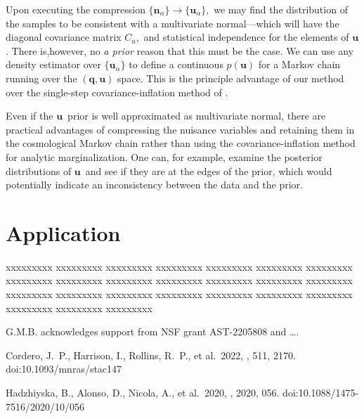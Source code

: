 \documentclass[linenumbers, onecolumn]{aastex63}
\newcommand{\vecq}{\ensuremath{\mathbf{q}}}
\newcommand{\vecn}{\ensuremath{\mathbf{n}}}
\newcommand{\vecu}{\ensuremath{\mathbf{u}}}
\newcommand{\covm}{C}
\begin{document}
Upon executing the compression $\{\vecn_\alpha\} \rightarrow
\{\vecu_\alpha\},$ we may find the distribution of the samples to be
consistent with a multivariate normal---which will have the diagonal covariance
matrix $\covm_u,$ and statistical independence for the elements of
\vecu.
There is,however,  no \textit{a prior} reason that
this must be the case.  We can use any density estimator over
$\{\vecu_\alpha\}$ to define a continuous $p(\vecu)$ for a Markov
chain running over the $(\vecq,\vecu)$ space.  This is the principle
advantage of our method over the single-step covariance-inflation
method of \citet{hans}.

Even if the \vecu\ prior is well approximated as multivariate normal,
there are practical advantages of compressing the nuisance 
variables and retaining them in the cosmological Markov chain rather
than using the covariance-inflation method for analytic
marginalization.  One can, for example, examine the posterior
distributions of \vecu\ and see if they are at the edges of the prior,
which would potentially indicate an inconsistency between the data and
the prior.
  

\section{Application}\label{sec:app}

xxxxxxxxx xxxxxxxxx xxxxxxxxx xxxxxxxxx xxxxxxxxx xxxxxxxxx 
xxxxxxxxx xxxxxxxxx xxxxxxxxx xxxxxxxxx xxxxxxxxx xxxxxxxxx 
xxxxxxxxx xxxxxxxxx xxxxxxxxx xxxxxxxxx xxxxxxxxx xxxxxxxxx 
xxxxxxxxx xxxxxxxxx xxxxxxxxx xxxxxxxxx xxxxxxxxx xxxxxxxxx 

  \begin{acknowledgments}


G.M.B. acknowledges support from NSF grant AST-2205808 and \ldots.

\end{acknowledgments}
\begin{thebibliography}{dummy}
%
%
 Cordero, J.~P., Harrison, I., Rollins, R.~P., et al.\ 2022, \mnras, 511, 2170. doi:10.1093/mnras/stac147

 Hadzhiyska, B., Alonso, D., Nicola, A., et al.\ 2020, \jcap, 2020, 056. doi:10.1088/1475-7516/2020/10/056
\end{thebibliography}
\end{document}
